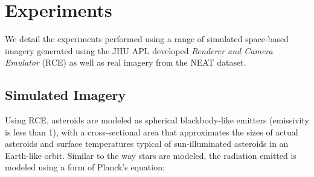 \section{Experiments}
%
%
%
%
%

\label{sec:experiments}

We detail the experiments performed using a range of simulated space-based imagery generated using the JHU APL developed {\em Renderer and Camera Emulator} (RCE) as well as real imagery from the NEAT dataset.  


\subsection{Simulated Imagery}
\label{ssec:simulated}

Using RCE, asteroids are  modeled as spherical blackbody-like emitters (emissivity is less than 1), with a cross-sectional area that approximates the sizes of actual asteroids and surface temperatures typical of sun-illuminated asteroids in an Earth-like orbit.  Similar to the way stars are modeled, the radiation emitted is modeled using a form of Planck's equation:

